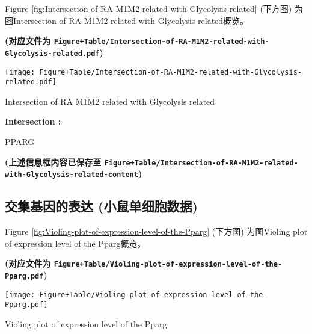 \documentclass[
]{article}
\begin{document}
Figure \ref{fig:Intersection-of-RA-M1M2-related-with-Glycolysis-related} (下方图) 为图Intersection of RA M1M2 related with Glycolysis related概览。

\textbf{(对应文件为 \texttt{Figure+Table/Intersection-of-RA-M1M2-related-with-Glycolysis-related.pdf})}

\def\@captype{figure}
\begin{center}
\texttt{[image: Figure+Table/Intersection-of-RA-M1M2-related-with-Glycolysis-related.pdf]}
\caption{Intersection of RA M1M2 related with Glycolysis related}\label{fig:Intersection-of-RA-M1M2-related-with-Glycolysis-related}
\end{center}
\begin{center}\begin{tcolorbox}[colback=gray!10, colframe=gray!50, width=0.9\linewidth, arc=1mm, boxrule=0.5pt]
\textbf{
Intersection
:}

\vspace{0.5em}

    PPARG

\vspace{2em}
\end{tcolorbox}
\end{center}

\textbf{(上述信息框内容已保存至 \texttt{Figure+Table/Intersection-of-RA-M1M2-related-with-Glycolysis-related-content})}

\hypertarget{ux4ea4ux96c6ux57faux56e0ux7684ux8868ux8fbe-ux5c0fux9f20ux5355ux7ec6ux80deux6570ux636e}{%
\subsection{交集基因的表达 (小鼠单细胞数据)}\label{ux4ea4ux96c6ux57faux56e0ux7684ux8868ux8fbe-ux5c0fux9f20ux5355ux7ec6ux80deux6570ux636e}}

Figure \ref{fig:Violing-plot-of-expression-level-of-the-Pparg} (下方图) 为图Violing plot of expression level of the Pparg概览。

\textbf{(对应文件为 \texttt{Figure+Table/Violing-plot-of-expression-level-of-the-Pparg.pdf})}

\def\@captype{figure}
\begin{center}
\texttt{[image: Figure+Table/Violing-plot-of-expression-level-of-the-Pparg.pdf]}
\caption{Violing plot of expression level of the Pparg}\label{fig:Violing-plot-of-expression-level-of-the-Pparg}
\end{center}
\end{document}
